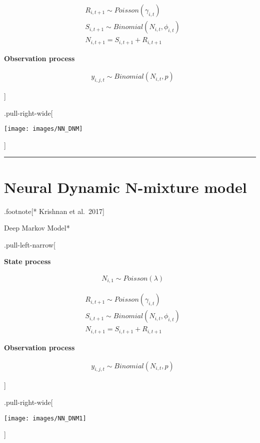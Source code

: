 \documentclass[
]{article}
\begin{document}
\[\begin{align*}
& R_{i,t+1} \sim Poisson(\gamma_{i,t})\\
& S_{i,t+1} \sim Binomial(N_{i,t}, \phi_{i,t})\\
& N_{i,t+1} = S_{i,t+1} + R_{i,t+1}
\end{align*}\]

\textbf{Observation process}

\[\begin{align*}
& y_{i,j,t} \sim Binomial(N_{i,t}, p)
\end{align*}\]

{]}

.pull-right-wide{[}

\texttt{[image: images/NN\_DNM]}

{]}

\begin{center}\rule{0.5\linewidth}{0.5pt}\end{center}

\section{Neural Dynamic N-mixture
model}\label{neural-dynamic-n-mixture-model-1}

.footnote{[}* Krishnan et al.~2017{]}

Deep Markov Model*

.pull-left-narrow{[}

\textbf{State process}

\[\begin{align*}
& N_{i,1} \sim Poisson(\lambda)
\end{align*}\]

\[\begin{align*}
& R_{i,t+1} \sim Poisson(\gamma_{i,t})\\
& S_{i,t+1} \sim Binomial(N_{i,t}, \phi_{i,t})\\
& N_{i,t+1} = S_{i,t+1} + R_{i,t+1}
\end{align*}\]

\textbf{Observation process}

\[\begin{align*}
& y_{i,j,t} \sim Binomial(N_{i,t}, p)
\end{align*}\]

{]}

.pull-right-wide{[}

\texttt{[image: images/NN\_DNM1]}

{]}
\end{document}
